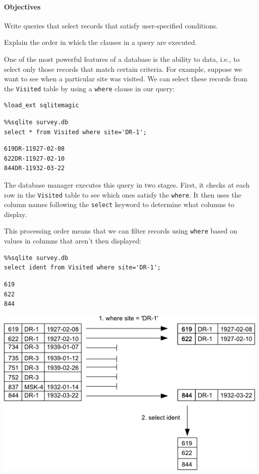 \documentclass{book}
\begin{document}
\mbox{}\paragraph{Objectives}

\begin{swcitemize}
\item
  Write queries that select records that satisfy user-specified
  conditions.
\item
  Explain the order in which the clauses in a query are executed.
\end{swcitemize}

One of the most powerful features of a database is the ability to
 data, i.e., to select only those records
that match certain criteria. For example, suppose we want to see when a
particular site was visited. We can select these records from the
\texttt{Visited} table by using a \texttt{where} clause in our query:

\begin{verbatim}
%load_ext sqlitemagic
\end{verbatim}

\begin{verbatim}
%%sqlite survey.db
select * from Visited where site='DR-1';
\end{verbatim}

\begin{verbatim}
619DR-11927-02-08
622DR-11927-02-10
844DR-11932-03-22
\end{verbatim}

The database manager executes this query in two stages. First, it checks
at each row in the \texttt{Visited} table to see which ones satisfy the
\texttt{where}. It then uses the column names following the
\texttt{select} keyword to determine what columns to display.

This processing order means that we can filter records using
\texttt{where} based on values in columns that aren't then displayed:

\begin{verbatim}
%%sqlite survey.db
select ident from Visited where site='DR-1';
\end{verbatim}

\begin{verbatim}
619
622
844
\end{verbatim}

\includegraphics{novice/sql/img/sql-filter.png}
\end{document}
